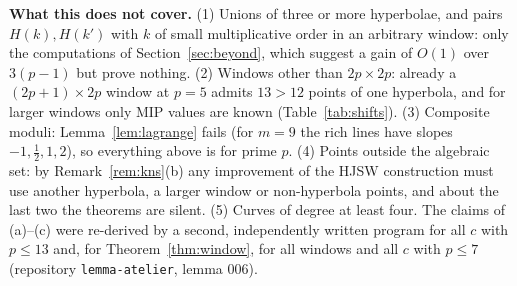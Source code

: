 \noindent\textbf{What this does not cover.}  (1) Unions of three or more hyperbolae, and pairs $H(k),H(k')$ with $k$ of small multiplicative order
in an arbitrary window: only the computations of Section~\ref{sec:beyond}, which suggest a gain of $O(1)$ over $3(p-1)$ but prove nothing.
(2) Windows other than $2p\times2p$: already a $(2p+1)\times2p$ window at $p=5$ admits $13>12$ points of one hyperbola, and for larger windows
only MIP values are known (Table~\ref{tab:shifts}).  (3) Composite moduli: Lemma~\ref{lem:lagrange} fails (for $m=9$ the rich lines have slopes
$-1,\tfrac12,1,2$), so everything above is for prime $p$.  (4) Points outside the algebraic set: by Remark~\ref{rem:kns}(b) any improvement of the
HJSW construction must use another hyperbola, a larger window or non-hyperbola points, and about the last two the theorems are silent.
(5) Curves of degree at least four.  The claims of (a)--(c) were re-derived by a second, independently written program for all $c$ with $p\le13$
and, for Theorem~\ref{thm:window}, for all windows and all $c$ with $p\le7$ (repository \texttt{lemma-atelier}, lemma 006).
